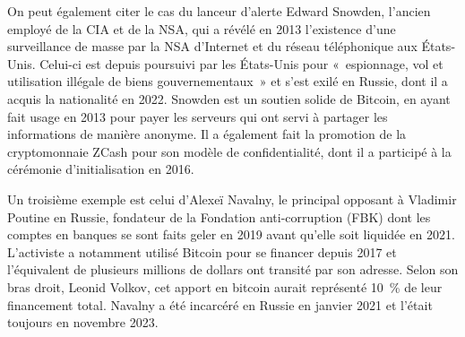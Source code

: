 On peut également citer le cas du lanceur d'alerte Edward Snowden, l'ancien employé de la CIA et de la NSA, qui a révélé en 2013 l'existence d'une surveillance de masse par la NSA d'Internet et du réseau téléphonique aux États-Unis. Celui-ci est depuis poursuivi par les États-Unis pour «~espionnage, vol et utilisation illégale de biens gouvernementaux~» et s'est exilé en Russie, dont il a acquis la nationalité en 2022. Snowden est un soutien solide de Bitcoin, en ayant fait usage en 2013 pour payer les serveurs qui ont servi à partager les informations de manière anonyme. Il a également fait la promotion de la cryptomonnaie ZCash pour son modèle de confidentialité, dont il a participé à la cérémonie d'initialisation en 2016.

Un troisième exemple est celui d'Alexeï Navalny, le principal opposant à Vladimir Poutine en Russie, fondateur de la Fondation anti-corruption (FBK) dont les comptes en banques se sont faits geler en 2019 avant qu'elle soit liquidée en 2021. L'activiste a notamment utilisé Bitcoin pour se financer depuis 2017 et l'équivalent de plusieurs millions de dollars ont transité par son adresse. Selon son bras droit, Leonid Volkov, cet apport en bitcoin aurait représenté 10~\% de leur financement total. Navalny a été incarcéré en Russie en janvier 2021 et l'était toujours en novembre 2023.


